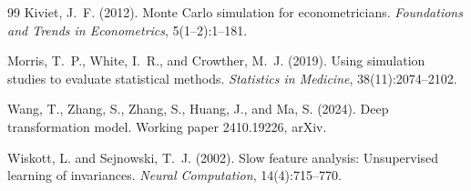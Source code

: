 \documentclass[11pt]{article}
\theoremstyle{tight}
\begin{document}
\begin{thebibliography}{99}
Kiviet, J.~F. (2012). Monte Carlo simulation for econometricians. \emph{Foundations and Trends in
Econometrics}, 5(1--2):1--181.

Morris, T.~P., White, I.~R., and Crowther, M.~J. (2019). Using simulation studies to evaluate
statistical methods. \emph{Statistics in Medicine}, 38(11):2074--2102.

Wang, T., Zhang, S., Zhang, S., Huang, J., and Ma, S. (2024). Deep transformation model.
Working paper 2410.19226, arXiv.

Wiskott, L. and Sejnowski, T.~J. (2002). Slow feature analysis: Unsupervised learning of
invariances. \emph{Neural Computation}, 14(4):715--770.

\end{thebibliography}
\end{document}
